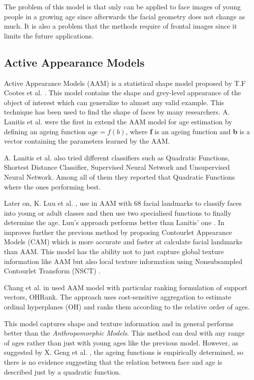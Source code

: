 The problem of this model is that only can be applied to face images of young people in a growing age since afterwards the facial geometry does not change as much. It is also a problem that the methods require of frontal images since it limits the future applications.

\subsection{Active Appearance Models}

Active Appearance Models (AAM) is a statistical shape model proposed by T.F Cootes et al. \cite{Cootes:2001:AAM:378040.378090}. This model contains the shape and grey-level appearance of the object of interest which can generalize to almost any valid example. This technique has been used to find the shape of faces by many researchers. A. Lanitis et al. \cite{791208, 993553, Lanitis:2004:CDC:2225304.2226166} were the first in extend the AAM model for age estimation by defining an ageing function $age=f(b)$, where \textbf{f} is an ageing function and \textbf{b} is a vector containing the parameters learned by the AAM.

A. Lanitis et al. \cite{Lanitis:2004:CDC:2225304.2226166} also tried different classifiers such as Quadratic Functions, Shortest Distance Classifier, Supervised Neural Network and Unsupervised Neural Network. Among all of them they reported that Quadratic Functions where the ones performing best.

Later on, K. Luu et al. \cite{Luu:2009:AEU:1736406.1736456, LuuSSBS11}, use in \cite{Luu:2009:AEU:1736406.1736456} AAM with 68 facial landmarks to classify faces into young or adult classes and then use two specialised functions to finally determine the age. Luu's approach performs better than Lanitis' one \cite{Lanitis:2004:CDC:2225304.2226166}. In \cite{LuuSSBS11} improves further the previous method by proposing Contourlet Appearance Models (CAM) which is more accurate and faster at calculate facial landmarks than AAM. This model has the ability not to just capture global texture information like AAM but also local texture information using Nonsubsampled Contourlet Transform (NSCT) \cite{1703596}.

Chang et al. in \cite{5995437} used AAM model with particular ranking formulation of support vectors, OHRank. The approach uses cost-sensitive aggregation to estimate ordinal hyperplanes (OH) and ranks them according to the relative order of ages.

This model captures shape and texture information and in general performs better than the \textit{Anthropomorphic Models}. This method can deal with any range of ages rather than just with young ages like the previous model. However, as suggested by X. Geng et al. \cite{Geng:2006:LFA:1180639.1180711}, the ageing functions is empirically determined, so there is no evidence suggesting that the relation between face and age is described just by a quadratic function.

